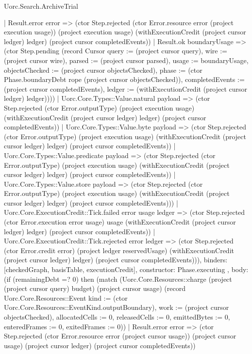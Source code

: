 \begin{lexlean}{Uorc.Search.ArchiveTrial}
\begin{semanticmodule}
{{{              | Result.error error => (ctor Step.rejected (ctor Error.resource error (project execution usage)) (project execution usage) (withExecutionCredit (project cursor ledger) ledger) (project cursor completedEvents))
              | Result.ok boundaryUsage => (ctor Step.pending (record Cursor {query := (project cursor query), wire := (project cursor wire), parsed := (project cursor parsed), usage := boundaryUsage, objectsChecked := (project cursor objectsChecked), phase := (ctor Phase.boundaryDebt rope (project cursor objectsChecked)), completedEvents := (project cursor completedEvents), ledger := (withExecutionCredit (project cursor ledger) ledger)})))
            | Uorc.Core.Types::Value.natural payload => (ctor Step.rejected (ctor Error.outputType) (project execution usage) (withExecutionCredit (project cursor ledger) ledger) (project cursor completedEvents))
            | Uorc.Core.Types::Value.byte payload => (ctor Step.rejected (ctor Error.outputType) (project execution usage) (withExecutionCredit (project cursor ledger) ledger) (project cursor completedEvents))
            | Uorc.Core.Types::Value.predicate payload => (ctor Step.rejected (ctor Error.outputType) (project execution usage) (withExecutionCredit (project cursor ledger) ledger) (project cursor completedEvents))
            | Uorc.Core.Types::Value.store payload => (ctor Step.rejected (ctor Error.outputType) (project execution usage) (withExecutionCredit (project cursor ledger) ledger) (project cursor completedEvents)))
          | Uorc.Core.ExecutionCredit::Tick.failed error usage ledger => (ctor Step.rejected (ctor Error.execution error usage) usage (withExecutionCredit (project cursor ledger) ledger) (project cursor completedEvents))
          | Uorc.Core.ExecutionCredit::Tick.rejected error ledger => (ctor Step.rejected (ctor Error.credit error) (project ledger reservedUsage) (withExecutionCredit (project cursor ledger) ledger) (project cursor completedEvents))),
        binders: [checkedGraph, basisTable, executionCredit],
        constructor: Phase.executing
      },
      {
        body: (if (remainingDebt =? 0) then (match (Uorc.Core.Resources::charge (project (project cursor query) budget) (project cursor usage) (record Uorc.Core.Resources::Event {kind := (ctor Uorc.Core.Resources::EventKind.outputBoundary), work := (project cursor objectsChecked), allocatedCells := 0, releasedCells := 0, emittedBytes := 0, enteredFrames := 0, exitedFrames := 0}))
          | Result.error error => (ctor Step.rejected (ctor Error.resource error (project cursor usage)) (project cursor usage) (project cursor ledger) (project cursor completedEvents))
}}}
\end{semanticmodule}
\end{lexlean}
